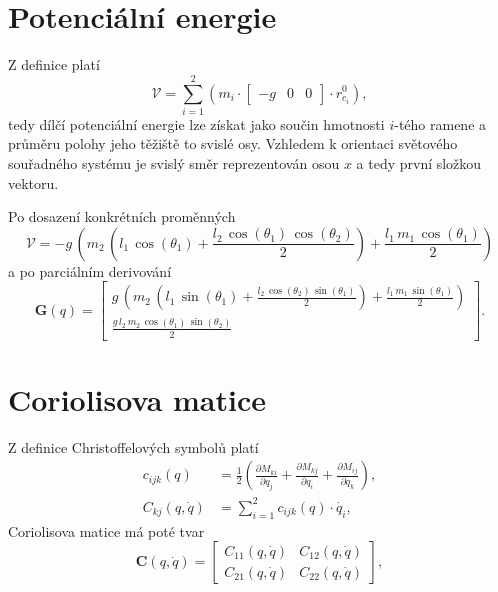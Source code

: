 \documentclass[twoside]{article}
\begin{document}
\section{Potenciální energie}

Z definice platí
\begin{equation}
	\mathcal{V} = \sum_{i=1}^2 (m_i \cdot \begin{bmatrix}
		-g & 0 & 0
	\end{bmatrix} \cdot r^0_{c_i}),
\end{equation}
tedy dílčí potenciální energie lze získat jako součin hmotnosti $i$-tého ramene a průměru polohy jeho těžiště to svislé osy.
Vzhledem k orientaci světového souřadného systému je svislý směr reprezentován osou $x$ a tedy první složkou vektoru.

Po dosazení konkrétních proměnných
\begin{equation}
	\mathcal{V} = -g\,\left(m_{2}\,\left(l_{1}\,\cos\left(\theta _{1}\right)+\frac{l_{2}\,\cos\left(\theta _{1}\right)\,\cos\left(\theta _{2}\right)}{2}\right)+\frac{l_{1}\,m_{1}\,\cos\left(\theta _{1}\right)}{2}\right)
\end{equation}
a po parciálním derivování
\begin{equation}
	\mathbf{G}(q) = \begin{bmatrix}
		g\,\left(m_{2}\,\left(l_{1}\,\sin\left(\theta _{1}\right)+\frac{l_{2}\,\cos\left(\theta _{2}\right)\,\sin\left(\theta _{1}\right)}{2}\right)+\frac{l_{1}\,m_{1}\,\sin\left(\theta _{1}\right)}{2}\right) \\
		\frac{g\,l_{2}\,m_{2}\,\cos\left(\theta _{1}\right)\,\sin\left(\theta _{2}\right)}{2}
	\end{bmatrix}.
	\label{eq:G}
\end{equation}

\section{Coriolisova matice}

Z definice Christoffelových symbolů platí
\begin{equation}
	\begin{split}
		c_{ijk}(q) &= \frac{1}{2} \left(\frac{\partial M_{ki}}{\partial q_j} + \frac{\partial M_{kj}}{\partial q_i} + \frac{\partial M_{ij}}{\partial q_k}\right), \\
		C_{kj}(q, \dot{q}) &= \sum_{i=1}^2 c_{ijk}(q) \cdot \dot{q_i},
	\end{split}
\end{equation}
Coriolisova matice má poté tvar
\begin{equation}
	\mathbf{C}(q, \dot{q}) = \begin{bmatrix}
		C_{11}(q, \dot{q}) & C_{12}(q, \dot{q}) \\
		C_{21}(q, \dot{q}) & C_{22}(q, \dot{q})
	\end{bmatrix},
	\label{eq:C}
\end{equation}
\end{document}
